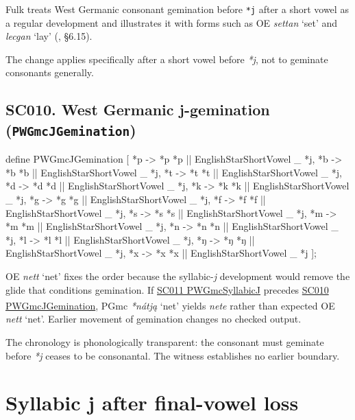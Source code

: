 \documentclass[
  british,
  a4paper,
  openany]{book}
\providecommand{\Pred}[1]{\textsuperscript{\dag}\emph{#1}}
\providecommand{\Recon}[1]{\emph{*#1}}
{\catcode`→=\active \global\def→{\ensuremath{\rightarrow}}}
\providecommand{\texorpdfstring}[2]{#1}
\providecommand{\Pred}[1]{\textsuperscript{\dag}\emph{#1}}
\providecommand{\Recon}[1]{\emph{*#1}}
{\catcode`→=\active \global\def→{\ensuremath{\rightarrow}}}
\begin{document}
Fulk treats West Germanic consonant gemination before \texttt{*j} after
a short vowel as a regular development and illustrates it with forms
such as OE \emph{settan} `set' and \emph{lecgan} `lay'
(, §6.15).

The change applies specifically after a short vowel before \emph{*j},
not to geminate consonants generally.

\subsection{\texorpdfstring{SC010. West Germanic j-gemination
(\texttt{PWGmcJGemination})}{SC010. West Germanic j-gemination (PWGmcJGemination)}}\label{rule-PWGmcJGemination}

\begin{ReaderFacingFoma}
define PWGmcJGemination [
    {*p} -> {*p} {*p} || EnglishStarShortVowel _ {*j},
    {*b} -> {*b} {*b} || EnglishStarShortVowel _ {*j},
    {*t} -> {*t} {*t} || EnglishStarShortVowel _ {*j},
    {*d} -> {*d} {*d} || EnglishStarShortVowel _ {*j},
    {*k} -> {*k} {*k} || EnglishStarShortVowel _ {*j},
    {*g} -> {*g} {*g} || EnglishStarShortVowel _ {*j},
    {*f} -> {*f} {*f} || EnglishStarShortVowel _ {*j},
    {*s} -> {*s} {*s} || EnglishStarShortVowel _ {*j},
    {*m} -> {*m} {*m} || EnglishStarShortVowel _ {*j},
    {*n} -> {*n} {*n} || EnglishStarShortVowel _ {*j},
    {*l} -> {*l} {*l} || EnglishStarShortVowel _ {*j},
    {*ŋ} -> {*ŋ} {*ŋ} || EnglishStarShortVowel _ {*j},
    {*x} -> {*x} {*x} || EnglishStarShortVowel _ {*j}
];
\end{ReaderFacingFoma}

OE \emph{nett} `net' fixes the order because the syllabic-\emph{j}
development would remove the glide that conditions gemination. If
\hyperref[rule-PWGmcSyllabicJ]{SC011 PWGmcSyllabicJ} precedes
\hyperref[rule-PWGmcJGemination]{SC010 PWGmcJGemination}, PGmc
\Recon{nátją} `net' yields \Pred{nete} rather than expected OE
\emph{nett} `net'. Earlier movement of gemination changes no checked
output.

The chronology is phonologically transparent: the consonant must
geminate before \emph{*j} ceases to be consonantal. The witness
establishes no earlier boundary.

\newpage

\section{Syllabic j after final-vowel
loss}\label{syllabic-j-after-final-vowel-loss}
\end{document}
